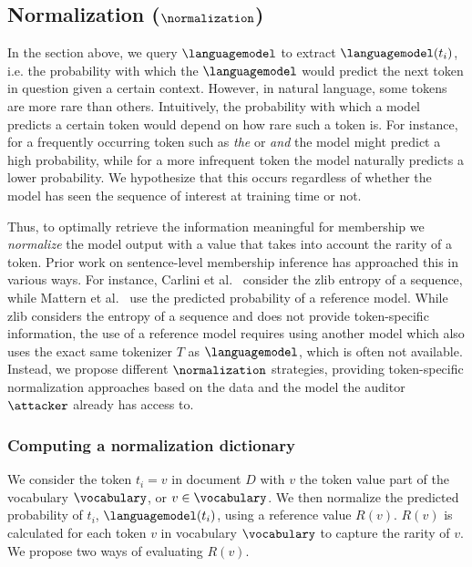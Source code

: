 \documentclass[twocolumn,10pt]{article}
\begin{document}
\subsection{Normalization (\texorpdfstring{$\normalization$}{Lg})}
\label{sec:normalization}

In the section above, we query $\languagemodel$ to extract $\languagemodel(t_i)$, i.e. the probability with which the $\languagemodel$ would predict the next token in question given a certain context. 
However, in natural language, some tokens are more rare than others. Intuitively, the probability with which a model predicts a certain token would depend on how rare such a token is. For instance, for a frequently occurring token such as \emph{the} or \emph{and} the model might predict a high probability, while for a more infrequent token the model naturally predicts a lower probability. We hypothesize that this occurs regardless of whether the model has seen the sequence of interest at training time or not. 

Thus, to optimally retrieve the information meaningful for membership we \emph{normalize} the model output with a value that takes into account the rarity of a token.
Prior work on sentence-level membership inference has approached this in various ways. For instance, Carlini et al.~\cite{carlini2021extracting} consider the zlib entropy of a sequence, while Mattern et al.~\cite{mattern2023membership} use the predicted probability of a reference model. While zlib considers the entropy of a sequence and does not provide token-specific information, the use of a reference model requires using another model which also uses the exact same tokenizer $T$ as $\languagemodel$, which is often not available. Instead, we propose different $\normalization$ strategies, providing token-specific normalization approaches based on the data and the model the auditor $\attacker$ already has access to.

\subsubsection{Computing a normalization dictionary}
\label{sec:norm_dict}

We consider the token $t_i=v$ in document $D$ with $v$ the token value part of the vocabulary $\vocabulary$, or $v \in \vocabulary$. We then normalize the predicted probability of $t_i$, $\languagemodel(t_i)$, using a reference value $R(v)$. $R(v)$ is calculated for each token $v$ in vocabulary $\vocabulary$ to capture the rarity of $v$. We propose two ways of evaluating $R(v)$.
\end{document}
